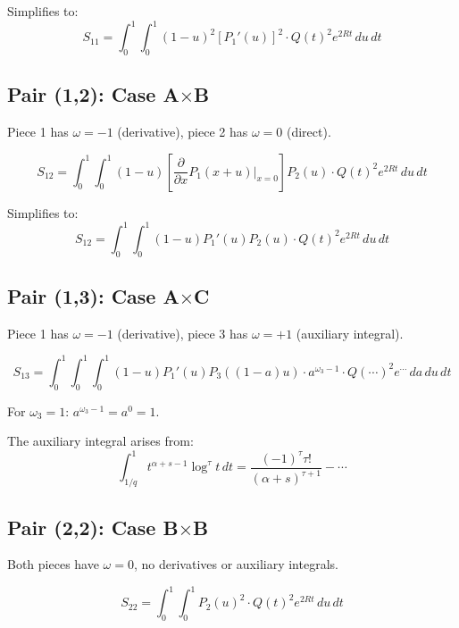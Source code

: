 \documentclass[11pt]{article}
\begin{document}
Simplifies to:
\begin{equation}
S_{11} = \int_0^1 \int_0^1 (1-u)^2 [P_1'(u)]^2 \cdot Q(t)^2 e^{2Rt} \, du\, dt
\end{equation}

\subsection{Pair (1,2): Case A$\times$B}

Piece 1 has $\omega = -1$ (derivative), piece 2 has $\omega = 0$ (direct).

\begin{equation}
S_{12} = \int_0^1 \int_0^1 (1-u) \left[\frac{\partial}{\partial x} P_1(x+u) \Big|_{x=0}\right] P_2(u) \cdot Q(t)^2 e^{2Rt} \, du\, dt
\end{equation}

Simplifies to:
\begin{equation}
S_{12} = \int_0^1 \int_0^1 (1-u) P_1'(u) P_2(u) \cdot Q(t)^2 e^{2Rt} \, du\, dt
\end{equation}

\subsection{Pair (1,3): Case A$\times$C}

Piece 1 has $\omega = -1$ (derivative), piece 3 has $\omega = +1$ (auxiliary integral).

\begin{equation}
S_{13} = \int_0^1 \int_0^1 \int_0^1 (1-u) P_1'(u) P_3((1-a)u) \cdot a^{\omega_3-1} \cdot Q(\cdots)^2 e^{\cdots} \, da\, du\, dt
\end{equation}

For $\omega_3 = 1$: $a^{\omega_3-1} = a^0 = 1$.

The auxiliary integral arises from:
\begin{equation}
\int_{1/q}^1 t^{\alpha+s-1} \log^\tau t \, dt = \frac{(-1)^\tau \tau!}{(\alpha+s)^{\tau+1}} - \cdots
\end{equation}

\subsection{Pair (2,2): Case B$\times$B}

Both pieces have $\omega = 0$, no derivatives or auxiliary integrals.

\begin{equation}
S_{22} = \int_0^1 \int_0^1 P_2(u)^2 \cdot Q(t)^2 e^{2Rt} \, du\, dt
\end{equation}
\end{document}
